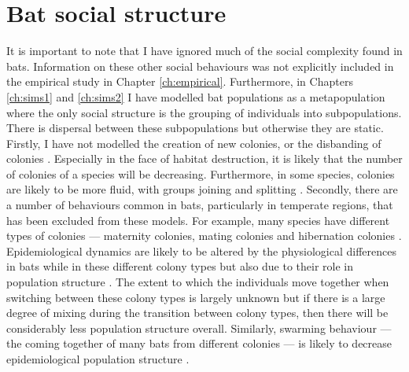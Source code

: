 


\section{Bat social structure}

It is important to note that I have ignored much of the social complexity found in bats.
Information on these other social behaviours was not explicitly included in the empirical study in Chapter \ref{ch:empirical}.
Furthermore, in Chapters \ref{ch:sims1} and \ref{ch:sims2} I have modelled bat populations as a metapopulation where the only social structure is the grouping of individuals into subpopulations.
There is dispersal between these subpopulations but otherwise they are static.
Firstly, I have not modelled the creation of new colonies, or the disbanding of colonies \cite{metheny2008genetic}.
Especially in the face of habitat destruction, it is likely that the number of colonies of a species will be decreasing.
Furthermore, in some species, colonies are likely to be more fluid, with groups joining and splitting \cite{kerth2012causes, august2014sympatric}.
Secondly, there are a number of behaviours common in bats, particularly in temperate regions, that has been excluded from these models.
For example, many species have different types of colonies --- maternity colonies, mating colonies and hibernation colonies \cite{kerth2008causes}.
Epidemiological dynamics are likely to be altered by the physiological differences in bats while in these different colony types  but also due to their role in population structure \cite{george2011host, langwig2015host, blehert2012fungal, webber2016social}.
The extent to which the individuals move together when switching between these colony types is largely unknown \cite{kurta2002philopatry, baerwald2016migratory} but if there is a large degree of mixing during the transition between colony types, then there will be considerably less population structure overall.
Similarly, swarming behaviour --- the coming together of many bats from different colonies --- is likely to decrease epidemiological population structure \cite{kerth2012causes}.


